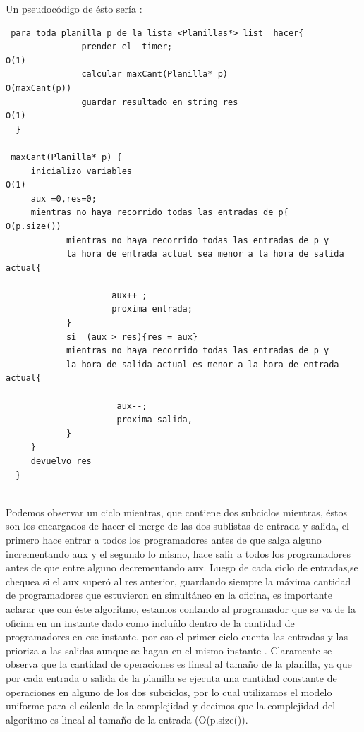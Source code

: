 Un pseudocódigo de ésto sería : 
\begin{verbatim}
 para toda planilla p de la lista <Planillas*> list  hacer{
               prender el  timer;                                    O(1)
               calcular maxCant(Planilla* p)                         O(maxCant(p))
               guardar resultado en string res                       O(1)
  }
  
 maxCant(Planilla* p) { 
     inicializo variables                                             O(1)
     aux =0,res=0;		
     mientras no haya recorrido todas las entradas de p{              O(p.size())
            mientras no haya recorrido todas las entradas de p y 
            la hora de entrada actual sea menor a la hora de salida actual{
		  
                     aux++ ;
                     proxima entrada;		
	        }
            si  (aux > res){res = aux}
            mientras no haya recorrido todas las entradas de p y 
            la hora de salida actual es menor a la hora de entrada actual{
			   
                      aux--;				 	
                      proxima salida,
            }
     }	
	 devuelvo res 
  }
	  
\end{verbatim}
Podemos observar un ciclo mientras, que contiene dos subciclos mientras, éstos son los encargados de hacer el merge de las dos sublistas de entrada y salida, el primero hace entrar a todos los programadores antes de que salga alguno incrementando aux y el segundo lo mismo, hace salir a todos los programadores antes de que entre alguno decrementando aux. 
\newline
Luego de cada ciclo de entradas,se chequea si el aux superó al res anterior, guardando siempre la máxima cantidad de programadores que estuvieron en simultáneo en la oficina, es importante aclarar que con éste algoritmo, estamos contando al programador que se va de la oficina en un instante dado  como incluído dentro de la cantidad de programadores en ese instante, por eso el primer ciclo cuenta las entradas y las prioriza a las salidas aunque se hagan en el mismo instante .
\newline
Claramente se observa que la cantidad de operaciones es lineal al tamaño de la planilla, ya que por cada entrada o salida de la planilla se ejecuta una cantidad constante de operaciones en alguno de los dos subciclos, por lo cual utilizamos el modelo uniforme para el cálculo de la complejidad y decimos que la complejidad del algoritmo es lineal al tamaño de la entrada (O(p.size()).
